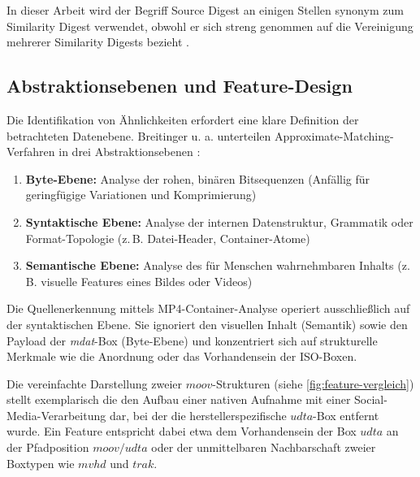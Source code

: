 In dieser Arbeit wird der Begriff Source Digest an einigen Stellen synonym zum Similarity Digest verwendet, obwohl er sich streng genommen auf die Vereinigung mehrerer Similarity Digests bezieht \cite[Kap. 3.3]{klier_media_2025}.


\subsection{Abstraktionsebenen und Feature-Design}

Die Identifikation von Ähnlichkeiten erfordert eine klare Definition der betrachteten Datenebene. Breitinger u. a. unterteilen Approximate-Matching-Verfahren in drei Abstraktionsebenen \cite[Kap. 2.2]{breitinger_approximate_2014}:

\begin{enumerate}
    \item \textbf{Byte-Ebene:} Analyse der rohen, binären Bitsequenzen (Anfällig für geringfügige Variationen und Komprimierung)
    \item \textbf{Syntaktische Ebene:} Analyse der internen Datenstruktur, Grammatik oder Format-Topologie (z.\,B. Datei-Header, Container-Atome)
    \item \textbf{Semantische Ebene:} Analyse des für Menschen wahrnehmbaren Inhalts (z.\,B. visuelle Features eines Bildes oder Videos)
\end{enumerate}

Die Quellenerkennung mittels MP4-Container-Analyse operiert ausschließlich auf der syntaktischen Ebene. Sie ignoriert den visuellen Inhalt (Semantik) sowie den Payload der \textit{mdat}-Box (Byte-Ebene) und konzentriert sich auf strukturelle Merkmale wie die Anordnung oder das Vorhandensein der ISO-Boxen.

Die vereinfachte Darstellung zweier \(moov\)-Strukturen (siehe \cref{fig:feature-vergleich}) stellt exemplarisch die den Aufbau einer nativen Aufnahme mit einer Social-Media-Verarbeitung dar, bei der die herstellerspezifische \(udta\)-Box entfernt wurde. Ein Feature entspricht dabei etwa dem Vorhandensein der Box \(udta\) an der Pfadposition \(moov / udta\) oder der unmittelbaren Nachbarschaft zweier Boxtypen wie \(mvhd\) und \(trak\). 

